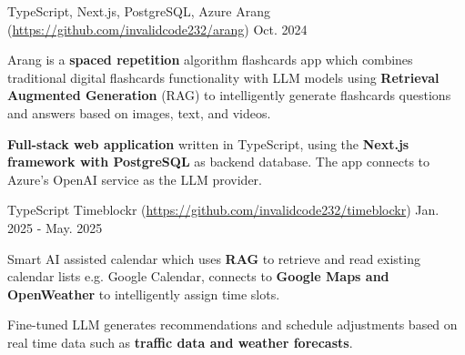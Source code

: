 
\begin{cventries}

  \cventry
    {TypeScript, Next.js, PostgreSQL, Azure} %
    {Arang (\url{https://github.com/invalidcode232/arang})} %
    {} %
    {Oct. 2024} %
    {
      \begin{cvitems} %
        \item {Arang is a \textbf{spaced repetition} algorithm flashcards app which combines traditional digital flashcards
functionality with LLM models using \textbf{Retrieval Augmented Generation} (RAG) to intelligently generate
flashcards questions and answers based on images, text, and videos.}
        \item {\textbf{Full-stack web application} written in TypeScript, using the \textbf{Next.js framework with PostgreSQL} as backend database. The app connects to Azure's OpenAI service as the LLM provider.}
      \end{cvitems}
    }

  \cventry
    {TypeScript} %
    {Timeblockr (\url{https://github.com/invalidcode232/timeblockr})} %
    {} %
    {Jan. 2025 - May. 2025} %
    {
      \begin{cvitems} %
        \item {Smart AI assisted calendar which uses \textbf{RAG} to retrieve and read existing calendar lists e.g. Google Calendar, connects to \textbf{Google Maps and OpenWeather} to intelligently
assign time slots.}
        \item {Fine-tuned LLM generates recommendations and schedule adjustments based on real time data such as \textbf{traffic data and weather forecasts}.}
      \end{cvitems}
    }

\end{cventries}
